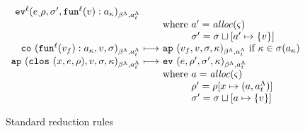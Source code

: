 \documentclass[preprint,onecolumn,9pt]{sigplanconf} %
\begin{document}
\begin{figure*}
\begin{gather*}
\begin{array}{@{}r@{\ }c@{\ }l@{}}
      \ev[^\mlab]{\mexpi, \menv, \msto', \spush{\kfn[^\mlab]{\mval}}{\mkaddr}}{\msmlab}{\mstimeline}
      \\
      && \text{where } \maddr' = \alloc(\mstate) \\
      &&\phantom{\text{where }} \msto' = \ext{\msto}{\maddr'}{\setof{\mval}} \\
      \co{\spush{\kfn[^\mlab]{\mval_f}}{\mkaddr}, \mval, \msto}{\msmlab}{\mstimeline} &\machstep&
      \ap{\mval_f, \mval, \msto, \mkont}{\msmlab}{\mstimeline} \text{ if } \mkont \in \msto(\mkaddr)
      \\
      \ap{\clos{\mvar, \mexp, \menv}, \mval, \msto, \mkont}{\msmlab}{\mstimeline} &\machstep&
      \ev{\mexp, \menv', \msto', \mkont}{\msmlab}{\mstimeline} \\
      &&\text{where } \maddr = \alloc(\mstate) \\
      &&\phantom{\text{where }} \menv' = \menv[\mvar \mapsto (\maddr, \mstimeline)] \\
      &&\phantom{\text{where }} \msto' = \ext{\msto}{\maddr}{\setof{\mval}}
    \end{array}    
  \end{gather*}
  \caption{Standard reduction rules}
  \label{fig:standard}
\end{figure*}
\end{document}
